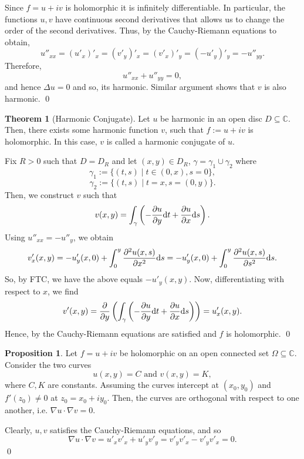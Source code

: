 \documentclass[
]{article}
\theoremstyle{definition}
\newtheorem{theorem}{Theorem}
\newtheorem{prop}{Proposition}
\theoremstyle{definition}
\begin{document}
Since \(f = u + iv\) is holomorphic it is infinitely differentiable. In
particular, the functions \(u, v\) have continuous second derivatives
that allows us to change the order of the second derivatives. Thus, by
the Cauchy-Riemann equations to obtain,
\[u''_{xx} = (u'_x)'_x = (v'_y)'_x = (v'_x)'_y = (-u'_y)'_y = -u''_{yy}.\]
Therefore, \[u''_{xx} + u''_{yy} = 0,\] and hence \(\Delta u = 0\) and
so, its harmonic. Similar argument shows that \(v\) is also harmonic.
\qed

\begin{theorem}[Harmonic Conjugate]
  Let \(u\) be harmonic in an open disc \(D \subseteq \mathbb{C}\). Then, there 
  exists some harmonic function \(v\), such that \(f := u + iv\) is holomorphic. 
  In this case, \(v\) is called a harmonic conjugate of \(u\).
\end{theorem}
\proof

Fix \(R > 0\) such that \(D = D_R\) and let \((x, y) \in D_R\),
\(\gamma = \gamma_1 \cup \gamma_2\) where
\[\gamma_1 := \{(t, s) \mid t \in (0, x), s = 0\},\]
\[\gamma_2 := \{(t, s) \mid t = x, s = (0, y)\}.\] Then, we construct
\(v\) such that
\[v(x, y) = \int_\gamma \left( - \pdv{u}{y} \dd t + \pdv{u}{x} \dd s\right).\]
Using \(u''_{xx} = -u''_{y}\), we obtain
\[v'_x(x, y) = - u'_y(x, 0) + \int_0^y \pdv[2]{u(x, s)}{x} \dd s 
    = - u'_y(x, 0) + \int_0^y \pdv[2]{u(x, s)}{s} \dd s.\] So, by FTC,
we have the above equals \(-u'_y(x, y)\). Now, differentiating with
respect to \(x\), we find
\[v'(x, y) = \pdv{y}\left(\int_\gamma \left( - \pdv{u}{y} \dd t + \pdv{u}{x} \dd s\right)\right) 
    = u_x'(x, y).\] Hence, by the Cauchy-Riemann equations are satisfied
and \(f\) is holomorphic. \qed

\begin{prop}
  Let \(f = u + iv\) be holomorphic on an open connected set \(\Omega \subseteq \mathbb{C}\). 
  Consider the two curves
  \[u(x, y) = C \text{ and } v(x, y) = K,\]
  where \(C, K\) are constants. Assuming the curves intercept at \((x_0, y_0)\) 
  and \(f'(z_0) \neq 0\) at \(z_0 = x_0 + iy_0\). Then, the curves are orthogonal 
  with respect to one another, i.e. \(\nabla u \cdot \nabla v = 0\).
\end{prop}
\proof

Clearly, \(u, v\) satisfies the Cauchy-Riemann equations, and so
\[\nabla u \cdot \nabla v = u'_x v'_x + u'_y v'_y = v'_yv'_x - v'_y v'_x = 0.\]
\qed
\end{document}
